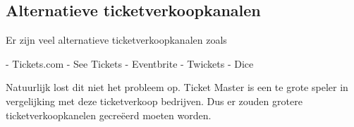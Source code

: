 \subsection{Alternatieve ticketverkoopkanalen}

Er zijn veel alternatieve ticketverkoopkanalen zoals

- Tickets.com
- See Tickets
- Eventbrite
- Twickets
- Dice

Natuurlijk lost dit niet het probleem op. Ticket Master is een te grote speler in vergelijking met deze ticketverkoop
bedrijven. Dus er zouden grotere ticketverkoopkanelen gecreëerd moeten worden.


